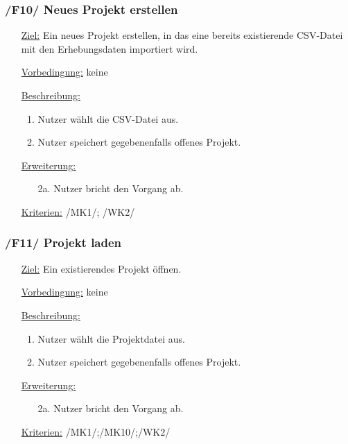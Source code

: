 \documentclass{article}
\begin{document}
\subsubsection*{/F10/ Neues Projekt erstellen}
\begin{itemize}
    \item[\underline{Ziel:}] Ein neues Projekt erstellen, in das eine bereits existierende CSV-Datei mit den Erhebungsdaten importiert wird.
    \item[\underline{Vorbedingung:}] keine
    \item[\underline{Beschreibung:}]
    \begin{enumerate}
        \item Nutzer wählt die CSV-Datei aus.
        \item Nutzer speichert gegebenenfalls offenes Projekt.
    \end{enumerate}
    \item[\underline{Erweiterung:}]
    \begin{itemize}
        \item[2a.] Nutzer bricht den Vorgang ab.
    \end{itemize}
    \item[\underline{Kriterien:}] /MK1/; /WK2/
\end{itemize}

\subsubsection*{/F11/ Projekt laden}
\begin{itemize}
    \item[\underline{Ziel:}] Ein existierendes Projekt öffnen.
    \item[\underline{Vorbedingung:}] keine
    \item[\underline{Beschreibung:}]
    \begin{enumerate}
        \item Nutzer wählt die Projektdatei aus.
        \item Nutzer speichert gegebenenfalls offenes Projekt.
    \end{enumerate}
    \item[\underline{Erweiterung:}]
    \begin{itemize}
        \item[2a.] Nutzer bricht den Vorgang ab.
    \end{itemize}
    \item[\underline{Kriterien:}] /MK1/;/MK10/;/WK2/
\end{itemize}
\end{document}
